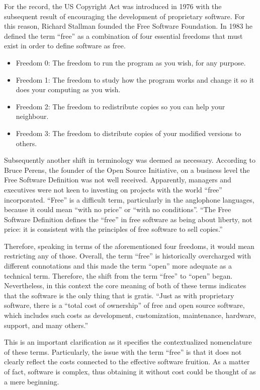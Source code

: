 For the record, the US Copyright Act was introduced in 1976 with the subsequent result of encouraging the development of proprietary software.
For this reason, Richard Stallman founded the Free Software Foundation. In 1983 he defined the term “free” as a combination of four essential freedoms that must exist in order to define software as free.

\begin{itemize}
\item Freedom 0: The freedom to run the program as you wish, for any purpose.
\item Freedom 1: The freedom to study how the program works and change it so it does your computing as you wish.
\item Freedom 2: The freedom to redistribute copies so you can help your neighbour.
\item Freedom 3: The freedom to distribute copies of your modified versions to others.
\end{itemize}

Subsequently another shift in terminology was deemed as necessary. According to Bruce Perens, the founder of the Open Source Initiative, on a business level the Free Software Definition was not well received. Apparently, managers and executives were not keen to investing on projects with the world “free” incorporated.
“Free” is a difficult term, particularly in the anglophone languages, because it could mean “with no price” or “with no conditions”.
“The Free Software Definition defines the “free” in free software as being about liberty, not price: it is consistent with the principles of free software to sell copies.”

Therefore, speaking in terms of the aforementioned four freedoms, it would mean restricting any of those. Overall, the term “free” is historically overcharged with different connotations and this made the term “open” more adequate as a technical term. Therefore, the shift from the term “free” to “open” began. Nevertheless, in this context the core meaning of both of these terms indicates that the software is the only thing that is gratis. “Just as with proprietary software, there is a “total cost of ownership” of free and open source software, which includes such costs as development, customization, maintenance, hardware, support, and many others.”

This is an important clarification as it specifies the contextualized nomenclature of these terms. Particularly, the issue with the term “free” is that it does not clearly reflect the costs connected to the effective software fruition. As a matter of fact, software is complex, thus obtaining it without cost could be thought of as a mere beginning.

